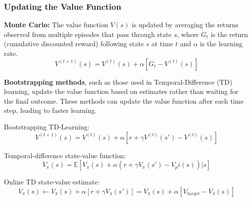 \subsubsection{Updating the Value Function}
\textbf{Monte Carlo:} The value function \(V(s)\) is updated by averaging the returns observed from multiple episodes that pass through state \(s\), where \(G_t\) is the return (cumulative discounted reward) following state \(s\) at time \(t\) and \(\alpha\) is the learning rate.
\[
V^{(t+1)}(s) = V^{(t)}(s) + \alpha\left[G_t - V^{(t)}(s)\right]
\]

\textbf{Bootstrapping methods}, such as those used in Temporal-Difference (TD) learning, update the value function based on estimates rather than waiting for the final outcome.
These methods can update the value function after each time step, leading to faster learning.

Bootstrapping TD-Learning:
\[
V^{(t+1)}(s) = V^{(t)}(s) + \alpha\left[r + \gamma V^{(t)}(s') - V^{(t)}(s)\right]
\]

Temporal-difference state-value function:
\[
V_\pi(s) = \mathbb{E}\left[V_\pi(s) + \alpha(r + \gamma V_\pi(s')-V_pi(s))|s\right]
\]

Online TD state-value estimate:
\[
V_\pi(s) \leftarrow V_\pi(s) + \alpha\left[r + \gamma V_\pi(s')\right] = V_\pi(s) + \alpha \left[V_{target} - V_\pi(s)\right]
\]

